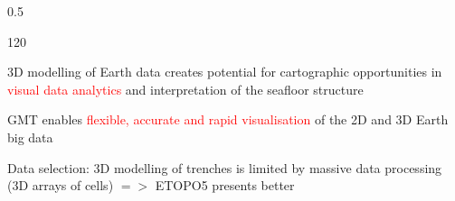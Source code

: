 \documentclass[pdflatex,compress,8pt,
	xcolor={dvipsnames,svgnames,x11names,table},
	hyperref={colorlinks = true,breaklinks = true, urlcolor = NavyBlue}]{beamer}
\begin{document}
\begin{frame}
\begin{minipage}[0.4\textheight]{\textwidth}
\begin{columns}[T]
\begin{column}{0.5\textwidth}
\begin{dinglist}{120}
     \item 3D modelling of Earth data creates potential for cartographic opportunities in \textcolor{red}{visual data analytics} and interpretation of the seafloor structure
     \item GMT enables \textcolor{red}{flexible, accurate and rapid visualisation} of the 2D and 3D Earth big data
     \item Data selection: 3D modelling of trenches is limited by massive data processing (3D arrays of cells) $=>$  ETOPO5 presents better
 \end{dinglist} 
\end{column}
\end{columns}
\end{minipage}
\end{frame}

\end{document}
